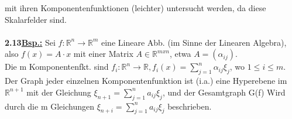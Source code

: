 \documentclass[]{scrartcl}
\begin{document}
mit ihren Komponentenfunktionen (leichter) untersucht werden, da diese 
Skalarfelder sind.\\
\\
\textbf{2.13\underline{Bsp.:}} Sei $f:\mathbb{R}^n\rightarrow\mathbb{R}^m$ eine 
Lineare Abb. (im Sinne der Linearen Algebra),\\
also $f(x)= A\cdot x$ mit einer Matrix $A\in \mathbb{R}^{mxn}$, etwa 
$A=(\alpha_{ij})$.\\
Die m Komponentenfkt. sind $f_i:\mathbb{R}^n\rightarrow\mathbb{R}, 
f_i(x)=\sum_{j=1}^{n}\alpha_{ij}\xi_j$, wo $1\leq i\leq m$.\\
Der Graph jeder einzelnen Komponentenfunktion ist (i.a.) eine Hyperebene im 
$\mathbb{R}^{n+1}$ mit der Gleichung $\xi_{n+1}=\sum_{j=1}^{n}a_{ij}\xi_j$, und 
der Gesamtgraph G(f) Wird durch die m Gleichungen 
$\xi_{n+i}=\sum_{j=1}^{n}a_{ij}\xi_j$ beschrieben.
\end{document}
